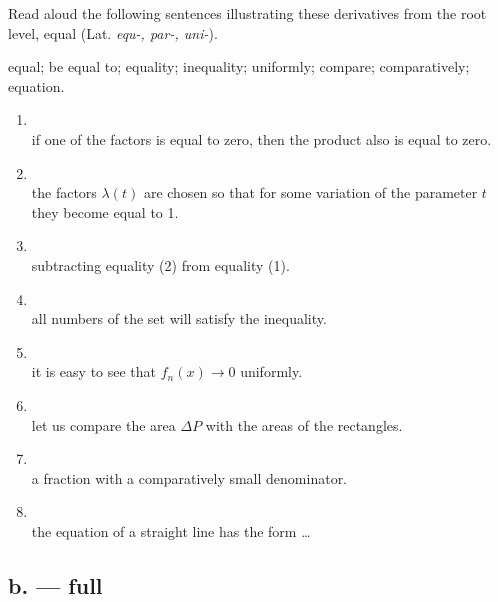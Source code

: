 \begin{keybox}[Exercise 5.7]
Read aloud the following sentences illustrating these derivatives from the root  level, equal (Lat. \emph{equ-, par-, uni-}).
\end{keybox}

\noindent{} equal;  be equal to;  equality;  inequality;  uniformly;  compare;  comparatively;  equation.

\begin{enumerate}[label=\arabic*)]
\item {}\\
      if one of the factors is equal to zero, then the product also is equal to zero.
\item {}\\
      the factors $\lambda(t)$ are chosen so that for some variation of the parameter $t$ they become equal to 1.
\item {}\\
      subtracting equality (2) from equality (1).
\item {}\\
      all numbers of the set will satisfy the inequality.
\item {}\\
      it is easy to see that $f_n(x)\to0$ uniformly.
\item {}\\
      let us compare the area $\Delta P$ with the areas of the rectangles.
\item {}\\
      a fraction with a comparatively small denominator.
\item {}\\
      the equation of a straight line has the form \ldots
\end{enumerate}

\subsection*{b.  --- full}

